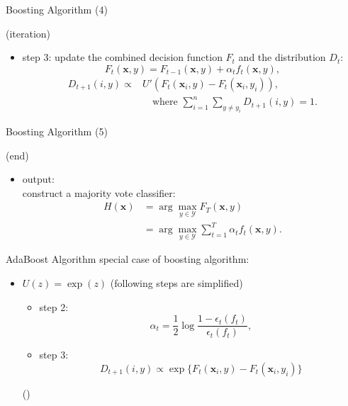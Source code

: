 \documentclass[fleqn,aspectratio=1610]{beamer}
\begin{document}
\begin{frame}[label={sec:org7e1ffd0}]{Boosting Algorithm (4)}
\begin{block}{(iteration)}
\begin{itemize}
\item \alert{step 3:}
update the combined decision function \(F_t\) and the distribution \(D_t\):
\begin{equation}
  F_{t}(\boldsymbol{x},y)
  =F_{t-1}(\boldsymbol{x},y)+\alpha_{t}f_{t}(\boldsymbol{x},y),
\end{equation}
\begin{align}
  D_{t+1}(i,y)\propto
  & U'\left(F_{t}(\boldsymbol{x}_i,y)
    -F_{t}(\boldsymbol{x}_i,y_i)\right),\\
  &\quad\text{where }
    \sum_{i=1}^n\sum_{y\not=y_i}D_{t+1}(i,y)=1.
\end{align}
\end{itemize}
\end{block}
\end{frame}
\begin{frame}[label={sec:orgad7b272}]{Boosting Algorithm (5)}
\begin{block}{(end)}
\begin{itemize}
\item \alert{output:}\\[0pt]
construct a majority vote classifier:
\begin{align}
  H(\boldsymbol{x})
  &=\arg\max_{y\in\mathcal{Y}}F_{T}(\boldsymbol{x},y)\\
  &=\arg\max_{y\in\mathcal{Y}}\sum_{t=1}^T\alpha_{t}f_{t}(\boldsymbol{x},y).
\end{align}
\end{itemize}
\end{block}
\end{frame}

\begin{frame}[label={sec:org09acdfe}]{AdaBoost Algorithm}
special case of boosting algorithm:
\begin{itemize}
\item \(U(z)=\exp(z)\) (following steps are simplified)
\begin{itemize}
\item \alert{step 2:}
\begin{equation}
  \alpha_t 
  = \frac{1}{2} \log \frac{1-\epsilon_t(f_t)}{\epsilon_t(f_t)},
\end{equation}
\item \alert{step 3:}
\begin{equation}
  D_{t+1}(i,y) \propto 
  \exp \{F_t(\boldsymbol{x}_i,y)-F_t(\boldsymbol{x}_i,y_i)\}
\end{equation}
\end{itemize}
(\cite{FreundSchapire1997})
\end{itemize}
\end{frame}
\end{document}
